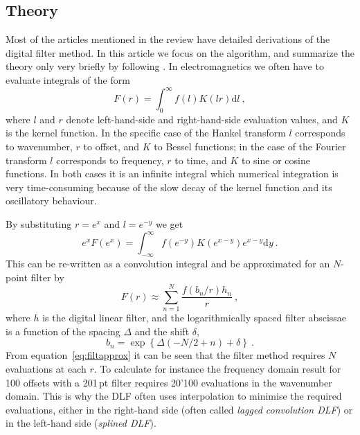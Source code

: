 \documentclass[paper,twocolumn,twoside]{geophysics}
\newcommand{\mr}[1]{\mathrm{#1}}
\begin{document}
\subsection{Theory}

Most of the articles mentioned in the review have detailed derivations of the
digital filter method. In this article we focus on the algorithm, and summarize
the theory only very briefly by following \cite{GEO.12.Key}. In
electromagnetics we often have to evaluate integrals of the form
%
\begin{equation}
  F(r) = \int^\infty_0 f(l)K(l r)\mr{d}l \ ,
  \label{eq:HankelInt}
\end{equation}
%
where $l$ and $r$ denote left-hand-side and right-hand-side evaluation values,
and $K$ is the kernel function. In the specific case of the Hankel transform
$l$ corresponds to wavenumber, $r$ to offset, and $K$ to Bessel functions; in
the case of the Fourier transform $l$ corresponds to frequency, $r$ to time,
and $K$ to sine or cosine functions. In both cases it is an infinite integral
which numerical integration is very time-consuming because of the slow decay
of the kernel function and its oscillatory behaviour.

By substituting $r = e^x$ and $l = e^{-y}$ we get
\begin{equation}
  e^x F(e^x) = \int^\infty_{-\infty} f(e^{-y})K(e^{x-y})e^{x-y}\mr{d}y\ .
  \label{eq:filtint}
\end{equation}
This can be re-written as a convolution integral and be approximated for an
$N$-point filter by
\begin{equation}
  F(r) \approx \sum^N_{n=1} \frac{f(b_n/r) h_n}{r}\ ,
  \label{eq:filtapprox}
\end{equation}
where $h$ is the digital linear filter, and the logarithmically spaced filter
abscissae is a function of the spacing $\Delta$ and the shift $\delta$,
\begin{equation}
  b_n = \exp\left\{\Delta(-N/2+n) + \delta\right\} \ .
  \label{eq:base}
\end{equation}
From equation~\ref{eq:filtapprox} it can be seen that the filter method
requires $N$ evaluations at each $r$. To calculate for instance the frequency
domain result for 100 offsets with a 201\,pt filter requires 20'100 evaluations
in the wavenumber domain. This is why the DLF often uses interpolation to
minimise the required evaluations, either in the right-hand side (often called
\emph{lagged convolution DLF}) or in the left-hand side (\emph{splined DLF}).
\end{document}
